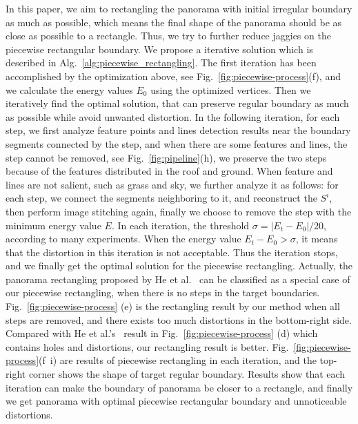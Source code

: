 \documentclass[10pt,journal,compsoc]{IEEEtran}
\begin{document}
In this paper, we aim to rectangling the panorama with initial irregular boundary as much as possible, which means the final shape of the panorama should be as close as possible to a rectangle.
Thus, we try to further reduce jaggies on the piecewise rectangular boundary.
We propose a iterative solution which is described in Alg.~\ref{alg:piecewise_rectangling}.
The first iteration has been accomplished by the optimization above, see Fig.~\ref{fig:piecewise-process}(f),  and we calculate the energy values $E_0$ using the optimized vertices.
Then we iteratively find the optimal solution, that can preserve regular boundary as much as possible while avoid unwanted distortion.
In the following iteration, for each step, we first analyze feature points and lines detection results near the boundary segments connected by the step, and when there are some features and lines, the step cannot be removed, see Fig.~\ref{fig:pipeline}(h), we preserve the two steps because of the features distributed in the roof and ground.
When feature and lines are not salient, such as grass and sky, we further analyze it as follows: for each step, we connect the segments neighboring to it, and reconstruct the  $S^i$, then perform image stitching again, finally we choose to remove the step with the minimum energy value $E$.
In each iteration, the threshold $\sigma=|E_t-E_0|/20$, according to many experiments.
When the energy value $E_t-E_0 > \sigma$, it means that the distortion in this iteration is not acceptable. Thus the iteration stops, and we finally get the optimal solution for the piecewise rectangling.
Actually, the panorama rectangling proposed by He et al.~\cite{journals/tog/HeC013} can be classified as a special case of our piecewise rectangling, when there is no steps in the target boundaries.
Fig.~\ref{fig:piecewise-process} (e) is the rectangling result by our method when all steps are removed, and there exists too much distortions in the bottom-right side.
Compared with He et al.'s~\cite{journals/tog/HeC013} result in Fig.~\ref{fig:piecewise-process} (d) which contains holes and distortions, our rectangling result is better.
Fig.~\ref{fig:piecewise-process}(f~i) are results of piecewise rectangling in each iteration, and the top-right corner shows the shape of target regular boundary.
Results show that each iteration can make the boundary of panorama be closer to a rectangle, and finally we get panorama with optimal piecewise rectangular boundary and unnoticeable distortions.
\end{document}
